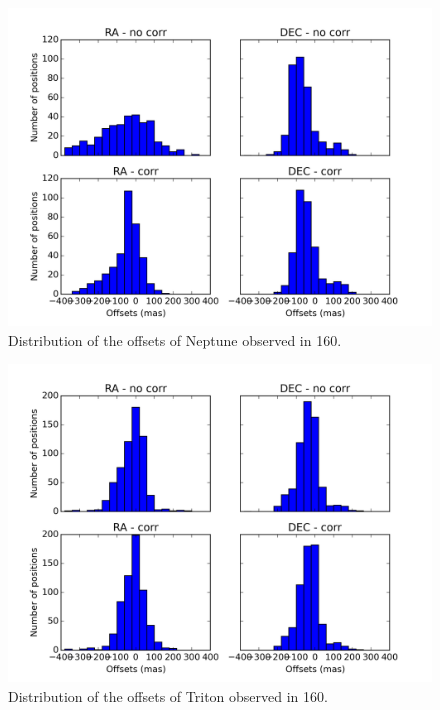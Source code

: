 \documentclass[12pt,a4paper]{report}
\begin{document}
\begin{figure}[h]
\includegraphics[width=17.0cm]{dist_Netuno_160.png} 
\caption{Distribution of the offsets of Neptune observed in 160.}
\label{Fig:refraction-net-160}
\end{figure}
\begin{figure}[h]
\includegraphics[width=17.0cm]{dist_Triton_160.png} 
\caption{Distribution of the offsets of Triton observed in 160.}
\label{Fig:refraction-tri-160}
\end{figure}
\end{document}
